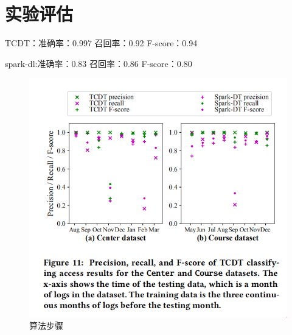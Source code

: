 \documentclass[UTF8]{ctexart}
\begin{document}
	\section{实验评估}\label{sec:dibajie}
	TCDT：准确率：0.997  召回率：0.92	F-score：0.94

	spark-dl:准确率：0.83  召回率：0.86   F-score：0.80
	\begin{figure}[ht]
        \centering
        \includegraphics[scale=0.5]{picture/007.png}
        \caption{算法步骤}
        \label{fig:007}
    \end{figure}
	\clearpage
	
\end{document}
